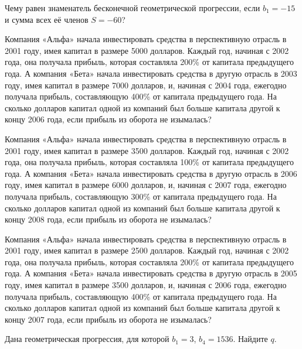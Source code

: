 \documentclass[4apaper]{article}
\begin{document}
\begin{taskBN}{56}
Чему равен знаменатель бесконечной геометрической прогрессии, если $b_1 = -15$ и сумма всех её членов $S=-60$?
\end{taskBN}

\begin{taskBN}{57}
Компания «Альфа» начала инвестировать средства в перспективную отрасль в 2001 году, имея капитал в размере 5000 долларов. Каждый год, начиная с 2002 года, она получала прибыль, которая составляла 200\% от капитала предыдущего года. А компания «Бета» начала инвестировать средства в другую отрасль в 2003 году, имея капитал в размере 7000 долларов, и, начиная с 2004 года, ежегодно получала прибыль, составляющую 400\% от капитала предыдущего года. На сколько долларов капитал одной из компаний был больше капитала другой к концу 2006 года, если прибыль из оборота не изымалась?
\end{taskBN}

\begin{taskBN}{58}
Компания «Альфа» начала инвестировать средства в перспективную отрасль в 2001 году, имея капитал в размере 3500 долларов. Каждый год, начиная с 2002 года, она получала прибыль, которая составляла 100\% от капитала предыдущего года. А компания «Бета» начала инвестировать средства в другую отрасль в 2006 году, имея капитал в размере 6000 долларов, и, начиная с 2007 года, ежегодно получала прибыль, составляющую 300\% от капитала предыдущего года. На сколько долларов капитал одной из компаний был больше капитала другой к концу 2008 года, если прибыль из оборота не изымалась?
\end{taskBN}

\begin{taskBN}{59}
Компания «Альфа» начала инвестировать средства в перспективную отрасль в 2001 году, имея капитал в размере 2500 долларов. Каждый год, начиная с 2002 года, она получала прибыль, которая составляла 200\% от капитала предыдущего года. А компания «Бета» начала инвестировать средства в другую отрасль в 2005 году, имея капитал в размере 3500 долларов, и, начиная с 2006 года, ежегодно получала прибыль, составляющую 400\% от капитала предыдущего года. На сколько долларов капитал одной из компаний был больше капитала другой к концу 2007 года, если прибыль из оборота не изымалась?
\end{taskBN}

\begin{taskBN}{60}
Дана геометрическая прогрессия, для которой $b_1 = 3$, $b_{4}=1536$. Найдите $q$.
\end{taskBN}
\end{document}
